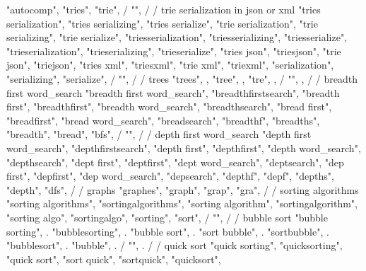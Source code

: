 {{{{{{{{{{        "autocomp",  
        "tries",  
        "trie",  
        / {"", 
        /
        / trie serialization in json or xml 
        "tries serialization",  
        "tries serializing",  
        "tries serialize",  
        "trie serialization",  
        "trie serializing",  
        "trie serialize",  
        "triesserialization",  
        "triesserializing",  
        "triesserialize",  
        "trieserialization",  
        "trieserializing",  
        "trieserialize",  
        "tries json",  
        "triesjson",  
        "trie json",  
        "triejson",  
        "tries xml",  
        "triesxml",  
        "trie xml",  
        "triexml",  
        "serialization",  
        "serializing",  
        "serialize",  
        / {"", 
        /
        / trees 
        "trees", , 
        "tree", , 
        "tre", , 
        / {"", ,
        /
        / breadth first word_search 
        "breadth first word_search",  
        "breadthfirstsearch",  
        "breadth first",  
        "breadthfirst",  
        "breadth word_search",  
        "breadthsearch",  
        "bread first",  
        "breadfirst",  
        "bread word_search",  
        "breadsearch",  
        "breadthf",  
        "breadths",  
        "breadth",  
        "bread",  
        "bfs",  
        / {"", 
        /
        / depth first word_search 
        "depth first word_search",  
        "depthfirstsearch",  
        "depth first",  
        "depthfirst",  
        "depth word_search",  
        "depthsearch",  
        "dept first",  
        "deptfirst",  
        "dept word_search",  
        "deptsearch",  
        "dep first",  
        "depfirst",  
        "dep word_search",  
        "depsearch",  
        "depthf",  
        "depf",  
        "depths",  
        "depth",  
        "dfs",  
        /
        / graphs 
        "graphes", 
        "graph", 
        "grap", 
        "gra", 
        /
        / sorting algorithms 
        "sorting algorithms",  
        "sortingalgorithms",  
        "sorting algorithm",  
        "sortingalgorithm",  
        "sorting algo",  
        "sortingalgo",  
        "sorting",  
        "sort",  
        / {"", 
        /
        / bubble sort 
        "bubble sorting", . 
        "bubblesorting", . 
        "bubble sort", . 
        "sort bubble", . 
        "sortbubble", . 
        "bubblesort", . 
        "bubble", . 
        / {"", .
        /
        / quick sort 
        "quick sorting",  
        "quicksorting",  
        "quick sort",  
        "sort quick",  
        "sortquick",  
        "quicksort",  
}}}}}}}}}}}}}}}}
